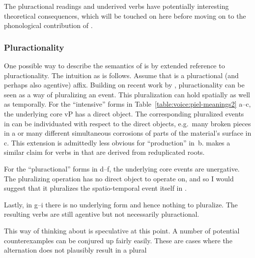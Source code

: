 \begin{exe}
\begin{xlist}
\begin{exe}
\begin{xlist}
\begin{exe}
\begin{xlist}
\begin{exe}
\begin{exe}
\begin{xlist}
\begin{exe}
\begin{xlist}
\begin{exe}
\begin{xlist}
\begin{exe}
\begin{xlist}
\begin{exe}
\begin{xlist}
\begin{exe}
\begin{xlist}
\begin{exe}
\begin{xlist}
\begin{exe}
\begin{xlist}
\begin{exe}
\begin{xlist}
\begin{exe}
\begin{xlist}
\begin{exe}
\begin{xlist}
\begin{exe}
\begin{xlist}
\begin{exe}
\begin{exe}
\begin{xlist}
\begin{exe}
\begin{xlist}
\begin{exe}
\begin{xlist}
\begin{exe}
\begin{xlist}
{\begin{exe}
\begin{xlist}
\begin{exe}
\begin{xlist}
\begin{exe}
\begin{xlist}
\begin{exe}
\begin{xlist}
\begin{xlist}
\begin{xlist}
\begin{exe}
\begin{xlist}
\begin{xlist}
\begin{xlist}
\begin{exe}
\begin{exe}
\begin{xlist}
\begin{exe}
\begin{xlist}
\begin{exe}
\begin{xlist}
\begin{exe}
\begin{xlist}
\begin{exe}
\begin{xlist}
\begin{exe}
\begin{xlist}
\begin{exe}
\begin{exe}
\begin{xlist}
\begin{xlist}
\begin{exe}
\begin{xlist}
\begin{exe}
\begin{xlist}
\begin{exe}
\begin{xlist}
\begin{exe}
\begin{xlist}
\begin{exe}
\begin{xlist}
\begin{exe}
\begin{xlist}
\begin{exe}
\begin{exe}
\begin{xlist}
\begin{exe}
\begin{xlist}
\begin{exe}
\begin{xlist}
\begin{exe}
\begin{xlist}
The pluractional readings and underived verbs have potentially interesting theoretical consequences, which will be touched on here before moving on to the phonological contribution of {\va}.

		\subsubsection{Pluractionality} \label{voice:va:sem:plural}
One possible way to describe the semantics of {\va} is by extended reference to pluractionality. The intuition as is follows. Assume that {\va} is a pluractional (and perhaps also agentive) affix. Building on recent work by \cite{henderson12phd,henderson17nllt}, pluractionality can be seen as a way of pluralizing an event. This pluralization can hold spatially as well as temporally. For the ``intensive'' forms in Table~\ref{table:voice:piel-meanings2} a--c, the underlying core vP has a direct object. The corresponding pluralized events in {\tpie} can be individuated with respect to the direct objects, e.g.~many broken pieces in a or many different simultaneous corrosions of parts of the material's surface in c. This extension is admittedly less obvious for ``production'' in~b. \cite{greenberg10} makes a similar claim for verbs in {\tpie} that are derived from reduplicated roots.

For the ``pluractional'' forms in d--f, the underlying core events are unergative. The pluralizing operation has no direct object to operate on, and so I would suggest that it pluralizes the spatio-temporal event itself in {\tpie}.

Lastly, in g--i there is no underlying form and hence nothing to pluralize. The resulting verbs are still agentive but not necessarily pluractional.

This way of thinking about {\tpie} is speculative at this point. A number of potential counterexamples can be conjured up fairly easily. These are cases where the alternation does not plausibly result in a plural 
\end{xlist}
\end{exe}
\end{xlist}
\end{exe}
\end{xlist}
\end{exe}
\end{xlist}
\end{exe}
\end{exe}
\end{xlist}
\end{exe}
\end{xlist}
\end{exe}
\end{xlist}
\end{exe}
\end{xlist}
\end{exe}
\end{xlist}
\end{exe}
\end{xlist}
\end{exe}
\end{xlist}
\end{xlist}
\end{exe}
\end{exe}
\end{xlist}
\end{exe}
\end{xlist}
\end{exe}
\end{xlist}
\end{exe}
\end{xlist}
\end{exe}
\end{xlist}
\end{exe}
\end{xlist}
\end{exe}
\end{exe}
\end{xlist}
\end{xlist}
\end{xlist}
\end{exe}
\end{xlist}
\end{xlist}
\end{xlist}
\end{exe}
\end{xlist}
\end{exe}
\end{xlist}
\end{exe}
\end{xlist}
\end{exe}}
\end{xlist}
\end{exe}
\end{xlist}
\end{exe}
\end{xlist}
\end{exe}
\end{xlist}
\end{exe}
\end{exe}
\end{xlist}
\end{exe}
\end{xlist}
\end{exe}
\end{xlist}
\end{exe}
\end{xlist}
\end{exe}
\end{xlist}
\end{exe}
\end{xlist}
\end{exe}
\end{xlist}
\end{exe}
\end{xlist}
\end{exe}
\end{xlist}
\end{exe}
\end{xlist}
\end{exe}
\end{xlist}
\end{exe}
\end{xlist}
\end{exe}
\end{exe}
\end{xlist}
\end{exe}
\end{xlist}
\end{exe}
\end{xlist}
\end{exe}
